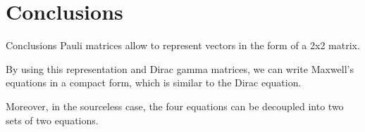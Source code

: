 \documentclass[handout,10pt]{beamer}
\begin{document}
%
%
%
%
%
%
%
%
%


\section{Conclusions}

\begin{frame}{Conclusions}
Pauli matrices allow to represent vectors in the form of a 2x2 matrix.

By using this representation and Dirac gamma matrices, we can write Maxwell's equations in a compact form, which is similar to the Dirac equation.

Moreover, in the sourceless case, the four equations can be decoupled into  two sets of two equations.

\end{frame}
\end{document}
